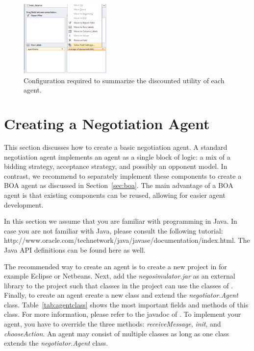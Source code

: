 \documentclass[]{article}
\begin{document}
\begin{figure}[htb]
	\centering
	\includegraphics[width=0.4\textwidth]{media/PivotTable.png}
\caption{Configuration required to summarize the discounted utility of each agent.}\label{fig:pivottable}
\end{figure}

\section{Creating a Negotiation Agent}
This section discusses how to create a basic negotiation agent. A standard negotiation agent implements an agent as a single block of logic: a mix of a bidding strategy, acceptance strategy, and possibly an opponent model. In contrast, we recommend to separately implement these components to create a BOA agent as discussed in Section~\ref{sec:boa}. The main advantage of a BOA agent is that existing components can be reused, allowing for easier agent development.

In this section we assume that you are familiar with programming in Java. In case you are not familiar with Java, please consult the following tutorial: http://www.oracle.com/technetwork/java/javase/documentation/index.html. The Java API definitions can be found here as well.

The recommended way to create an agent is to create a new project in for example Eclipse or Netbeans. Next, add the \textit{negosimulator.jar} as an external library to the project such that classes in the project can use the classes of \Genius. Finally, to create an agent create a new class and extend the \textit{negotiator.Agent} class. Table~\ref{tab:agentclass} shows the most important fields and methods of this class. For more information, please refer to the javadoc of \Genius. To implement your agent, you have to override the three methods: \textit{receiveMessage}, \textit{init}, and \textit{chooseAction}. An agent may consist of multiple classes as long as one class extends the \textit{negotiator.Agent} class.
\end{document}
